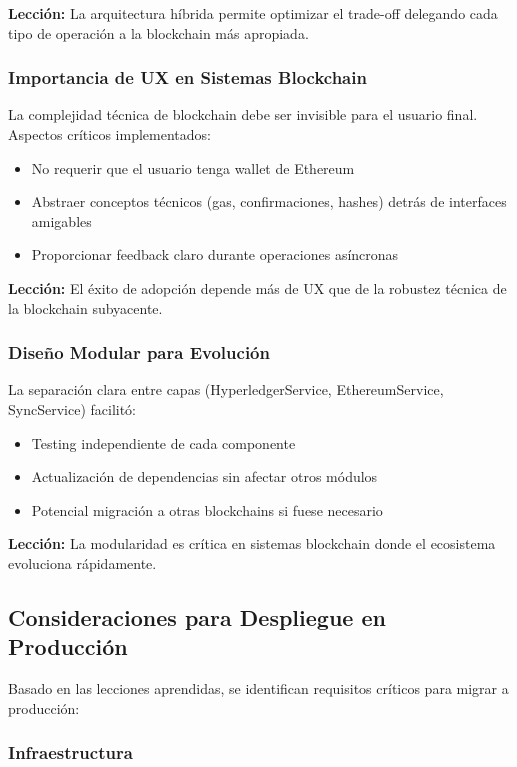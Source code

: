 \textbf{Lección:} La arquitectura híbrida permite optimizar el trade-off delegando cada tipo de operación a la blockchain más apropiada.

\subsubsection{Importancia de UX en Sistemas Blockchain}

La complejidad técnica de blockchain debe ser invisible para el usuario final. Aspectos críticos implementados:
\begin{itemize}
    \item No requerir que el usuario tenga wallet de Ethereum
    \item Abstraer conceptos técnicos (gas, confirmaciones, hashes) detrás de interfaces amigables
    \item Proporcionar feedback claro durante operaciones asíncronas
\end{itemize}

\textbf{Lección:} El éxito de adopción depende más de UX que de la robustez técnica de la blockchain subyacente.

\subsubsection{Diseño Modular para Evolución}

La separación clara entre capas (HyperledgerService, EthereumService, SyncService) facilitó:
\begin{itemize}
    \item Testing independiente de cada componente
    \item Actualización de dependencias sin afectar otros módulos
    \item Potencial migración a otras blockchains si fuese necesario
\end{itemize}

\textbf{Lección:} La modularidad es crítica en sistemas blockchain donde el ecosistema evoluciona rápidamente.

\subsection{Consideraciones para Despliegue en Producción}

Basado en las lecciones aprendidas, se identifican requisitos críticos para migrar a producción:

\subsubsection{Infraestructura}


